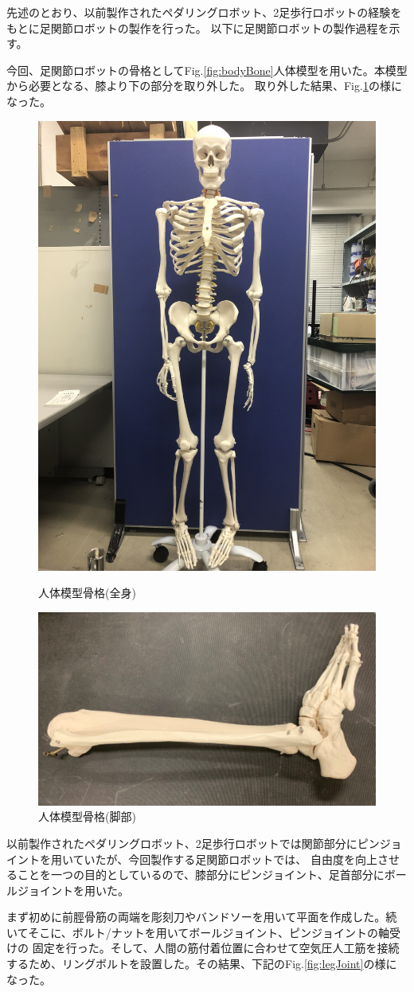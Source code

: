 先述のとおり、以前製作されたペダリングロボット、2足歩行ロボットの経験をもとに足関節ロボットの製作を行った。
以下に足関節ロボットの製作過程を示す。

今回、足関節ロボットの骨格としてFig.\ref{fig:bodyBone}人体模型を用いた。本模型から必要となる、膝より下の部分を取り外した。
取り外した結果、Fig.\ref{fig:legBone}の様になった。
\begin{figure}[h]
    \begin{center}
     \includegraphics[width=0.4\columnwidth,clip]{./2_measurement/bodyBone.eps}
     \caption{人体模型骨格(全身)}
     \label{fig:bodyBone}
    \end{center}
    \begin{center}
     \includegraphics[width=0.6\columnwidth,clip]{./2_measurement/legBone.eps}
     \caption{人体模型骨格(脚部)}
     \label{fig:legBone}
    \end{center}
\end{figure}
\newpage
以前製作されたペダリングロボット、2足歩行ロボットでは関節部分にピンジョイントを用いていたが、今回製作する足関節ロボットでは、
自由度を向上させることを一つの目的としているので、膝部分にピンジョイント、足首部分にボールジョイントを用いた。

まず初めに前脛骨筋の両端を彫刻刀やバンドソーを用いて平面を作成した。続いてそこに、ボルト/ナットを用いてボールジョイント、ピンジョイントの軸受けの
固定を行った。そして、人間の筋付着位置に合わせて空気圧人工筋を接続するため、リングボルトを設置した。その結果、下記のFig.\ref{fig:legJoint}の様になった。

